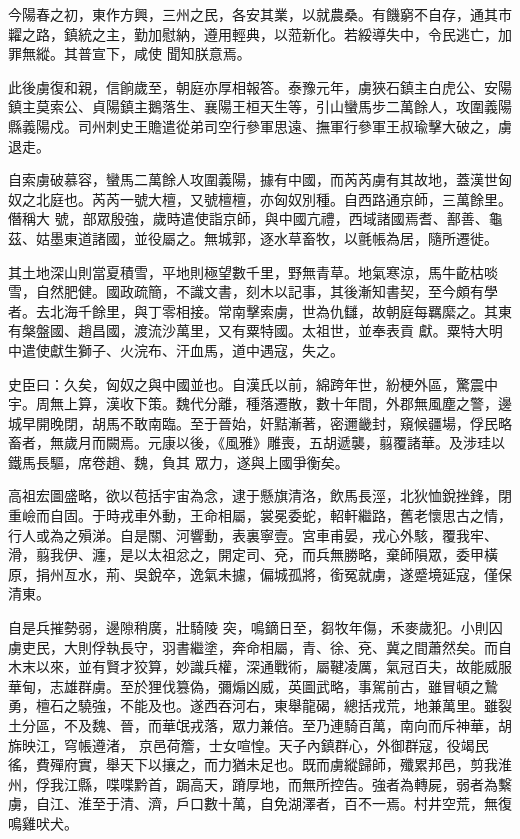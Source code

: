 \begin{pinyinscope}
 今陽春之初，東作方興，三州之民，各安其業，以就農桑。有饑窮不自存，通其市糶之路，鎮統之主，勤加慰納，遵用輕典，以蒞新化。若綏導失中，令民逃亡，加罪無縱。其普宣下，咸使
 聞知朕意焉。



 此後虜復和親，信餉歲至，朝庭亦厚相報答。泰豫元年，虜狹石鎮主白虎公、安陽鎮主莫索公、貞陽鎮主鵝落生、襄陽王桓天生等，引山蠻馬步二萬餘人，攻圍義陽縣義陽戍。司州刺史王贍遣從弟司空行參軍思遠、撫軍行參軍王叔瑜擊大破之，虜退走。



 自索虜破慕容，蠻馬二萬餘人攻圍義陽，據有中國，而芮芮虜有其故地，蓋漢世匈奴之北庭也。芮芮一號大檀，又號檀檀，亦匈奴別種。自西路通京師，三萬餘里。僭稱大
 號，部眾殷強，歲時遣使詣京師，與中國亢禮，西域諸國焉耆、鄯善、龜茲、姑墨東道諸國，並役屬之。無城郭，逐水草畜牧，以氈帳為居，隨所遷徙。



 其土地深山則當夏積雪，平地則極望數千里，野無青草。地氣寒涼，馬牛齕枯啖雪，自然肥健。國政疏簡，不識文書，刻木以記事，其後漸知書契，至今頗有學者。去北海千餘里，與丁零相接。常南擊索虜，世為仇讎，故朝庭每羈縻之。其東有槃盤國、趙昌國，渡流沙萬里，又有粟特國。太祖世，並奉表貢
 獻。粟特大明中遣使獻生獅子、火浣布、汗血馬，道中遇寇，失之。



 史臣曰：久矣，匈奴之與中國並也。自漢氏以前，綿跨年世，紛梗外區，驚震中宇。周無上算，漢收下策。魏代分離，種落遷散，數十年間，外郡無風塵之警，邊城早開晚閉，胡馬不敢南臨。至于晉始，奸黠漸著，密邇畿封，窺候疆場，俘民略畜者，無歲月而闕焉。元康以後，《風雅》雕喪，五胡遞襲，翦覆諸華。及涉珪以鐵馬長驅，席卷趙、魏，負其
 眾力，遂與上國爭衡矣。



 高祖宏圖盛略，欲以苞括宇宙為念，逮于懸旗清洛，飲馬長涇，北狄恤銳挫鋒，閉重嶮而自固。于時戎車外動，王命相屬，裳冕委蛇，軺軒繼路，舊老懷思古之情，行人或為之殞涕。自是關、河響動，表裏寧壹。宮車甫晏，戎心外駭，覆我牢、滑，翦我伊、瀍，是以太祖忿之，開定司、兗，而兵無勝略，棄師隕眾，委甲橫原，捐州亙水，荊、吳銳卒，逸氣未攄，偏城孤將，銜冤就虜，遂蹙境延寇，僅保清東。



 自是兵摧勢弱，邊隙稍廣，壯騎陵
 突，鳴鏑日至，芻牧年傷，禾麥歲犯。小則囚虜吏民，大則俘執長守，羽書繼塗，奔命相屬，青、徐、兗、冀之間蕭然矣。而自木末以來，並有賢才狡算，妙識兵權，深通戰術，屬鞬凌厲，氣冠百夫，故能威服華甸，志雄群虜。至於狸伐篡偽，彌煽凶威，英圖武略，事駕前古，雖冒頓之鷙勇，檀石之驍強，不能及也。遂西吞河右，東舉龍碣，總括戎荒，地兼萬里。雖裂土分區，不及魏、晉，而華氓戎落，眾力兼倍。至乃連騎百萬，南向而斥神華，胡旆映江，穹帳遵渚，
 京邑荷簷，士女喧惶。天子內鎮群心，外御群寇，役竭民徭，費殫府實，舉天下以攘之，而力猶未足也。既而虜縱歸師，殲累邦邑，剪我淮州，俘我江縣，喋喋黔首，跼高天，蹐厚地，而無所控告。強者為轉屍，弱者為繫虜，自江、淮至于清、濟，戶口數十萬，自免湖澤者，百不一焉。村井空荒，無復鳴雞吠犬。




\end{pinyinscope}
